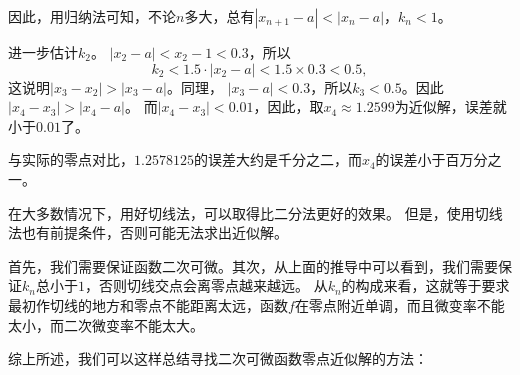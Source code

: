 \documentclass[12pt,UTF8]{ctexbook}
\begin{document}
因此，用归纳法可知，不论$n$多大，总有$|x_{n+1} - a| < |x_n - a|$，$k_n < 1$。

进一步估计$k_2$。
$|x_2 - a| < x_2 - 1 < 0.3$，所以
$$ k_2 < 1.5 \cdot |x_2 - a| < 1.5 \times 0.3 < 0.5, $$
这说明$|x_3 - x_2| > |x_3 - a|$。同理，
$|x_3 - a| < 0.3$，所以$k_3 < 0.5$。因此$|x_4 - x_3| > |x_4 - a|$。
而$|x_4 - x_3| < 0.01$，因此，取$x_4 \approx 1.2599$为近似解，误差就小于$0.01$了。

与实际的零点对比，$1.2578125$的误差大约是千分之二，而$x_4$的误差小于百万分之一。

在大多数情况下，用好切线法，可以取得比二分法更好的效果。
但是，使用切线法也有前提条件，否则可能无法求出近似解。

首先，我们需要保证函数二次可微。其次，从上面的推导中可以看到，我们需要保证$k_n$总小于$1$，否则切线交点会离零点越来越远。
从$k_n$的构成来看，这就等于要求最初作切线的地方和零点不能距离太远，函数$f$在零点附近单调，而且微变率不能太小，而二次微变率不能太大。

综上所述，我们可以这样总结寻找二次可微函数零点近似解的方法：

\begin{center}
\end{center}
\end{document}

